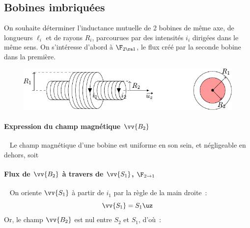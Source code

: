 \documentclass[../../main/main.tex]{subfiles}
\begin{document}
\subsection{Bobines imbriquées}
\label{ssec:inducmutimbriq}
On souhaite déterminer l'inductance mutuelle de 2 bobines de même axe, de
longueurs $\ell_{i}$ et de rayons $R_{i}$, parcourues par des intensités $i_{i}$
dirigées dans le même sens. On s'intéresse d'abord à $\F_{2\ra 1}$, le flux créé
par la seconde bobine dans la première.
\begin{figure}[h]
	\centering
	\includegraphics[scale=1]{bobimbriq}
	\label{fig:bobimbriq}
\end{figure}

\paragraph*{Expression du champ magnétique $\vv{B_2}$}~
\smallbreak
\noindent
Le champ magnétique d'une bobine est uniforme en son sein, et négligeable
en dehors, soit
\psw{%
	\[
		\vv{B_2} =
		\left\{%
		\begin{array}{lr}
			\DS
			\mu_0 \frac{N_2}{\ell_2}i_2\,\uz & \quad \text{à l'intérieur}
			\\
			\vv{0}                           & \quad \text{à l'extérieur}
		\end{array}
		\right.
	\]
}%
\vspace{-15pt}

\paragraph*{Flux de $\vv{B_2}$ à travers de $\vv{S_1}$, $\F_{2\to 1}$}~
\smallbreak
\noindent
On oriente $\vv{S_1}$ à partir de $i_1$ par la règle de la main droite~:
\[
	\vv{S_1} = S_1\uz
\]
Or, le champ $\vv{B_2}$ est nul entre $S_2$ et $S_1$, d'où~:
%
\vspace{-15pt}
\end{document}
